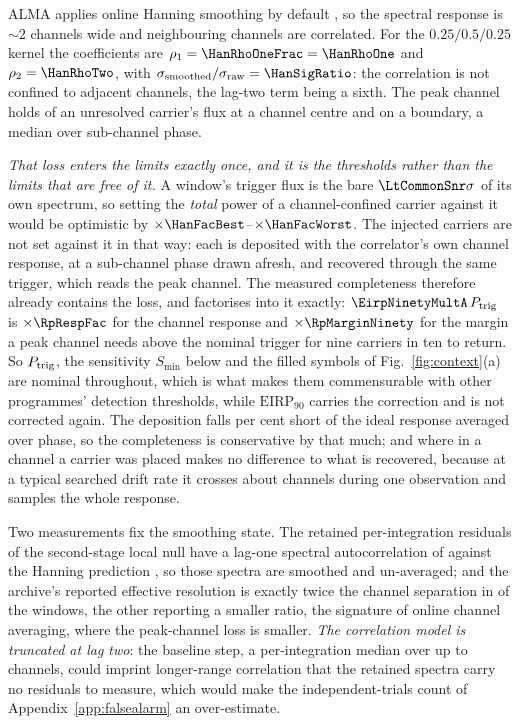 ALMA applies online Hanning smoothing by default \citep{ALMAHandbook}, so
the spectral response is ${\sim}2$ channels wide and neighbouring channels
are correlated. For the $0.25/0.5/0.25$ kernel the coefficients
are $\rho_1=\HanRhoOneFrac=\HanRhoOne$ and $\rho_2=\HanRhoTwo$, with
$\sigma_{\rm smoothed}/\sigma_{\rm raw}=\HanSigRatio$: the correlation is
not confined to adjacent channels, the lag-two term being a sixth. The peak
channel holds \HanBest{} of an unresolved carrier's flux at a channel centre
and \HanWorst{} on a boundary, a median \HanMed{} over sub-channel phase.

\emph{That loss enters the limits exactly once, and it is the thresholds
rather than the limits that are free of it.} A window's trigger flux is the
bare $\LtCommonSnr\sigma$ of its own spectrum, so setting the \emph{total}
power of a channel-confined carrier against it would be optimistic by
$\times\HanFacBest$--$\times\HanFacWorst$. The injected carriers are not set
against it in that way: each is deposited with the correlator's own channel
response, at a sub-channel phase drawn afresh, and recovered through the same
trigger, which reads the peak channel. The measured completeness therefore
already contains the loss, and factorises into it exactly:
$\EirpNinetyMultA\,P_{\rm trig}$ is $\times\RpRespFac$ for the channel
response and $\times\RpMarginNinety$ for the margin a peak channel needs
above the nominal trigger for nine carriers in ten to return. So
$P_{\rm trig}$, the sensitivity $S_{\min}$ below and the filled symbols of
Fig.~\ref{fig:context}(a) are nominal throughout, which is what makes them
commensurable with other programmes' detection thresholds, while
$\mathrm{EIRP}_{90}$ carries the correction and is not corrected again.
The deposition falls \InjShortPct{} per cent short of the ideal response
averaged over phase, so the completeness is conservative by that much; and
where in a channel a carrier was placed makes no difference to what is
recovered, because at a typical searched drift rate it crosses about
\InjDriftChan{} channels during one observation and samples the whole
response.

Two measurements fix the smoothing state. The retained per-integration
residuals of the second-stage local null have a lag-one spectral
autocorrelation of \LNLagOne{} against the Hanning prediction \HanRhoOne, so
those spectra are smoothed and un-averaged; and the archive's reported
effective resolution is exactly twice the channel separation in \NHanTwo{} of
the \NHanKnown{} windows, the other \NHanOther{} reporting a smaller ratio,
the signature of online channel averaging, where the peak-channel loss is
smaller. \emph{The correlation model is truncated at lag two}: the
baseline step, a per-integration median over up to \MedWin{} channels, could
imprint longer-range correlation that the retained spectra carry no residuals
to measure, which would make the independent-trials count of
Appendix~\ref{app:falsealarm} an over-estimate.

